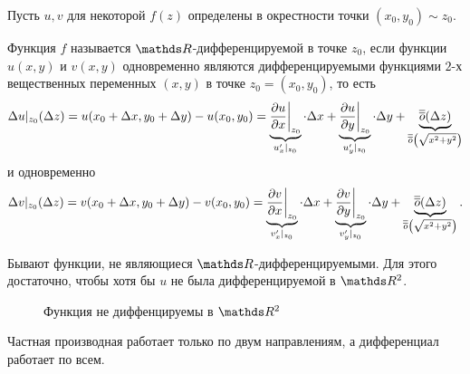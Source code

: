 Пусть $u,v$ для некоторой $f(z)$ определены в окрестности точки $(x_0,y_0)\sim z_0$.
\begin{Def}
	Функция $f$ называется $\R$-дифференцируемой в точке $z_0$, если функции $u(x,y)$ и $v(x,y)$ одновременно являются дифференцируемыми функциями $2$-х вещественных переменных $( x,y)$ в точке $z_0 = (x_0,y_0)$, то есть
	\[
		\Delta u|_{z_0}(\Delta z) = u(x_0+\Delta x,y_0+\Delta y) - u(x_0,y_0) = 
		\underbrace{\frac{\partial u}{\partial x}\bigg|_{z_0}}_{u'_x|_{z_0}}\cdot\Delta x + 
		\underbrace{\frac{\partial u}{\partial y}\bigg|_{z_0}}_{u'_y|_{z_0}}\cdot\Delta y +
		\underbrace{\overline{\overline o}(\Delta z)}_{\overline{\overline o}\left(\sqrt{x^2+y^2}\right)}
	\]
	и одновременно
	\[
		\Delta v|_{z_0}(\Delta z) = v(x_0+\Delta x,y_0+\Delta y) - v(x_0,y_0) = 
		\underbrace{\frac{\partial v}{\partial x}\bigg|_{z_0}}_{v'_x|_{z_0}}\cdot\Delta x + 
		\underbrace{\frac{\partial v}{\partial y}\bigg|_{z_0}}_{v'_y|_{z_0}}\cdot\Delta y +
		\underbrace{\overline{\overline o}(\Delta z)}_{\overline{\overline o}\left(\sqrt{x^2+y^2}\right)}.
	\]
\end{Def}
Бывают функции, не являющиеся $\R$-дифференцируемыми. Для этого достаточно, чтобы хотя бы $u$ не была дифференцируемой в $\R^2$.
\begin{figure}[H]
	\centering
	\caption{Функция не диффенцируемы в $\R^2$}
	\label{fig10}
\end{figure}
Частная производная работает только по двум направлениям, а дифференциал работает по всем.

